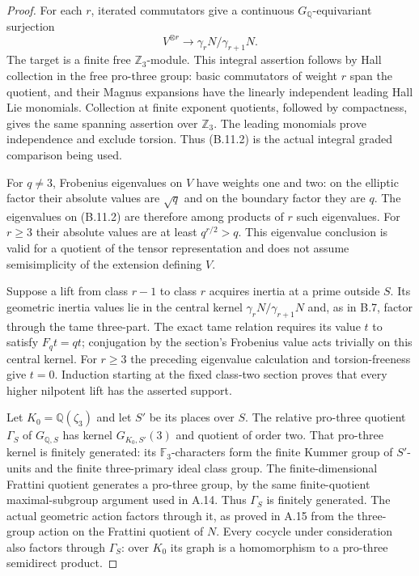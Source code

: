 \begin{proof}
For each $r$, iterated commutators give a continuous
$G_{\mathbb Q}$-equivariant surjection
\[
             V^{\otimes r}\longrightarrow
                    \gamma_rN/\gamma_{r+1}N.                 \tag{B.11.2}
\]
The target is a finite free $\mathbb Z_3$-module.
This integral assertion follows by Hall collection
in the free pro-three group: basic commutators of
weight $r$ span the quotient, and their Magnus
expansions have the linearly independent leading
Hall Lie monomials.  Collection at finite exponent
quotients, followed by compactness, gives the same
spanning assertion over $\mathbb Z_3$.
The leading monomials prove independence and exclude
torsion.  Thus (B.11.2) is the actual integral
graded comparison being used.

For $q\ne3$, Frobenius eigenvalues on $V$ have weights
one and two: on the elliptic factor their absolute
values are $\sqrt q$ and on the boundary factor they
are $q$.  The eigenvalues on (B.11.2) are therefore
among products of $r$ such eigenvalues.  For $r\ge3$
their absolute values are at least $q^{r/2}>q$.
This eigenvalue conclusion is valid for a quotient
of the tensor representation and does not assume
semisimplicity of the extension defining $V$.

Suppose a lift from class $r-1$ to class $r$ acquires
inertia at a prime outside $S$.  Its geometric
inertia values lie in the central kernel
$\gamma_rN/\gamma_{r+1}N$ and, as in B.7, factor
through the tame three-part.  The exact tame relation
requires its value $t$ to satisfy $F_qt=qt$;
conjugation by the section's Frobenius value acts
trivially on this central kernel.  For $r\ge3$ the
preceding eigenvalue calculation and torsion-freeness
give $t=0$.  Induction starting at the fixed class-two
section proves that every higher nilpotent lift has
the asserted support.

Let $K_0=\mathbb Q(\zeta_3)$ and let $S'$ be its
places over $S$.  The relative pro-three quotient
$\Gamma_S$ of $G_{\mathbb Q,S}$ has kernel
$G_{K_0,S'}(3)$ and quotient of order two.
That pro-three kernel is finitely generated: its
$\mathbb F_3$-characters form the finite Kummer group
of $S'$-units and the finite three-primary ideal
class group.  The finite-dimensional Frattini
quotient generates a pro-three group, by the same
finite-quotient maximal-subgroup argument used in A.14.
Thus $\Gamma_S$ is finitely generated.
The actual geometric action factors through it, as
proved in A.15 from the three-group action on the
Frattini quotient of $N$.  Every cocycle under
consideration also factors through $\Gamma_S$:
over $K_0$ its graph is a homomorphism to a
pro-three semidirect product.


\end{proof}
